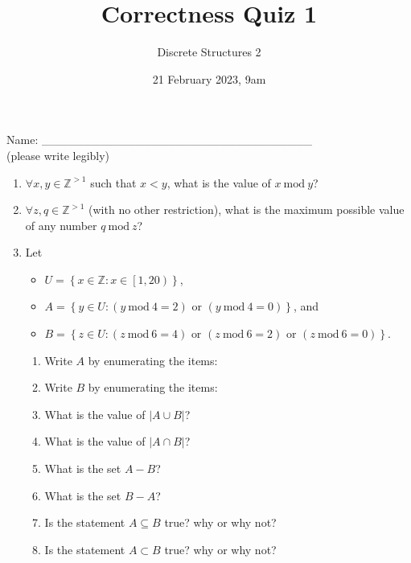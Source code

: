 \documentclass[11pt, oneside]{article}   	%
\title{Correctness Quiz 1}
\author{Discrete Structures 2}
\date{21 February 2023, 9am}							%
\newcommand{\ints}{\mathbb{Z}}
\renewcommand{\mod}{\ \mathrm{mod}\ }
\begin{document}
\maketitle
\begin{center}
Name: \_\_\_\_\_\_\_\_\_\_\_\_\_\_\_\_\_\_\_\_\_\_\_\_\_\_\_\_\_\_\_\_ \\(please write legibly) 
\end{center}

\begin{enumerate}


\item
$\forall x,y\in\ints^{>1}$ such that $x < y$, what is the value of $x\mod y$?
\vspace{3em}

\item 
$\forall z,q\in\ints^{>1}$ (with no other restriction), what is the maximum possible value of any number $q \mod z$?
\vspace{3em}

\item Let 
\begin{itemize}
\item $U = \left\{x \in \ints : x \in \left[1,20\right)\right\}$, 
\item $A = \left\{y \in U: \left(y \mod 4 = 2\right) \text{ or } \left(y \mod 4 = 0\right)\right\}$, and
\item $B = \left\{z \in U : \left(z \mod 6 = 4\right) \text{ or } \left(z \mod 6 = 2\right) \text{ or } \left(z \mod 6 = 0\right)\right\}$.
\end{itemize}
\begin{enumerate}
\item Write $A$ by enumerating the items: 
\vspace{1em}
\item Write $B$ by enumerating the items:
\vspace{1em}
\item What is the value of $\left|A \cup B\right|$?
\vspace{1em}
\item What is the value of $\left|A \cap B\right|$?
\vspace{1em}
\item What is the set $A - B$?
\vspace{1em}
\item What is the set $B - A$?
\vspace{1em}
\item Is the statement $A \subseteq B$ true? why or why not? 
\vspace{3em}
\item Is the statement $A \subset B$ true? why or why not? 
\vspace{3em}
\end{enumerate}


\end{enumerate}
\end{document}
